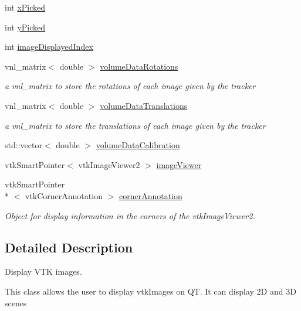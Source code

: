 \begin{DoxyCompactItemize}
\item 
int \hyperlink{class_q_v_t_k_image_widget_a17897def9ef084b36378099c51f94be3}{x\-Picked}
\item 
int \hyperlink{class_q_v_t_k_image_widget_a484346a1e5c956917e7e35a22aee125a}{y\-Picked}
\item 
int \hyperlink{class_q_v_t_k_image_widget_af88ceea1f8553e4773e50b0362ffec3a}{image\-Displayed\-Index}
\item 
vnl\-\_\-matrix$<$ double $>$ \hyperlink{class_q_v_t_k_image_widget_ab9aba72f9fc8e922555b96f30bd1dba3}{volume\-Data\-Rotations}
\begin{DoxyCompactList}\small\item\em a vnl\-\_\-matrix to store the rotations of each image given by the tracker \end{DoxyCompactList}\item 
vnl\-\_\-matrix$<$ double $>$ \hyperlink{class_q_v_t_k_image_widget_a039e71a63cbbba8d95894df141fa6986}{volume\-Data\-Translations}
\begin{DoxyCompactList}\small\item\em a vnl\-\_\-matrix to store the translations of each image given by the tracker \end{DoxyCompactList}\item 
std\-::vector$<$ double $>$ \hyperlink{class_q_v_t_k_image_widget_ad5069809b7e74c437884499f2aaaf0a0}{volume\-Data\-Calibration}
\item 
vtk\-Smart\-Pointer$<$ vtk\-Image\-Viewer2 $>$ \hyperlink{class_q_v_t_k_image_widget_aea73088ee5e4070c846427b8756cbfff}{image\-Viewer}
\item 
vtk\-Smart\-Pointer\\*
$<$ vtk\-Corner\-Annotation $>$ \hyperlink{class_q_v_t_k_image_widget_a4c5a9fab33dfc90a74abe775fb6c50f5}{corner\-Annotation}
\begin{DoxyCompactList}\small\item\em Object for display information in the corners of the vtk\-Image\-Viewer2. \end{DoxyCompactList}\end{DoxyCompactItemize}


\subsection{Detailed Description}
Display V\-T\-K images. 

This class allows the user to display vtk\-Images on Q\-T. It can display 2\-D and 3\-D scenes 

